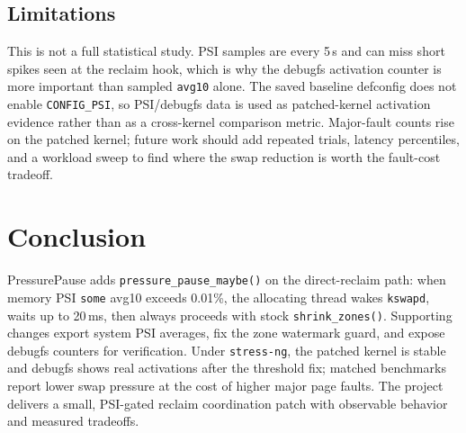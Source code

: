 \documentclass[12pt,a4paper]{article}
\begin{document}
\subsection{Limitations}

This is not a full statistical study. PSI samples are every 5\,s and can miss short spikes seen at the reclaim hook, which is why the debugfs activation counter is more important than sampled \texttt{avg10} alone. The saved baseline defconfig does not enable \texttt{CONFIG\_PSI}, so PSI/debugfs data is used as patched-kernel activation evidence rather than as a cross-kernel comparison metric. Major-fault counts rise on the patched kernel; future work should add repeated trials, latency percentiles, and a workload sweep to find where the swap reduction is worth the fault-cost tradeoff.

\section{Conclusion}

PressurePause adds \texttt{pressure\_pause\_maybe()} on the direct-reclaim path: when memory PSI \texttt{some} avg10 exceeds 0.01\%, the allocating thread wakes \texttt{kswapd}, waits up to 20\,ms, then always proceeds with stock \texttt{shrink\_zones()}. Supporting changes export system PSI averages, fix the zone watermark guard, and expose debugfs counters for verification. Under \texttt{stress-ng}, the patched kernel is stable and debugfs shows real activations after the threshold fix; matched benchmarks report lower swap pressure at the cost of higher major page faults. The project delivers a small, PSI-gated reclaim coordination patch with observable behavior and measured tradeoffs.
\end{document}
